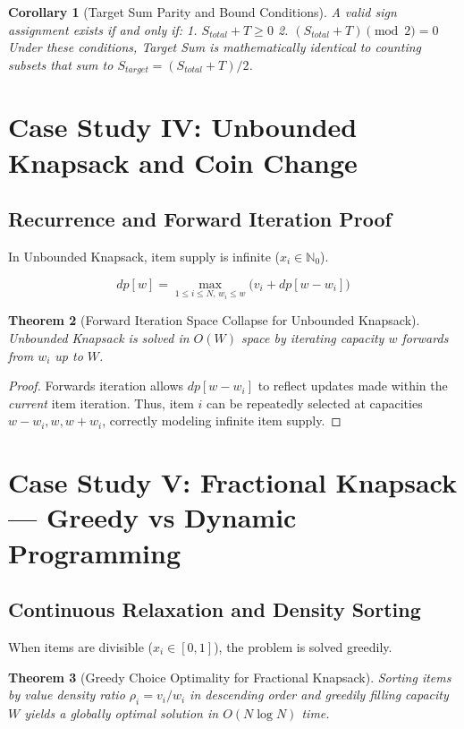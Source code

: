 \documentclass[10pt,journal,compsoc,onecolumn]{IEEEtran}
\newtheorem{theorem}{Theorem}
\newtheorem{corollary}[theorem]{Corollary}
\begin{document}
\begin{corollary}[Target Sum Parity and Bound Conditions]
A valid sign assignment exists if and only if:
1. $S_{total} + T \ge 0$
2. $(S_{total} + T) \pmod 2 = 0$
Under these conditions, Target Sum is mathematically identical to counting subsets that sum to $S_{target} = (S_{total} + T) / 2$.
\end{corollary}


\section{Case Study IV: Unbounded Knapsack and Coin Change}
\label{sec:unbounded-knapsack}

\subsection{Recurrence and Forward Iteration Proof}

In Unbounded Knapsack, item supply is infinite ($x_i \in \mathbb{N}_0$).

\[
dp[w] = \max_{1 \le i \le N, \, w_i \le w} \Big(v_i + dp[w - w_i]\Big)
\]

\begin{theorem}[Forward Iteration Space Collapse for Unbounded Knapsack]
Unbounded Knapsack is solved in $O(W)$ space by iterating capacity $w$ \emph{forwards} from $w_i$ up to $W$.
\end{theorem}

\begin{proof}
Forwards iteration allows $dp[w - w_i]$ to reflect updates made within the \emph{current} item iteration. Thus, item $i$ can be repeatedly selected at capacities $w - w_i, w, w + w_i$, correctly modeling infinite item supply.
\end{proof}


\section{Case Study V: Fractional Knapsack --- Greedy vs Dynamic Programming}
\label{sec:fractional-knapsack}

\subsection{Continuous Relaxation and Density Sorting}

When items are divisible ($x_i \in [0, 1]$), the problem is solved greedily.

\begin{theorem}[Greedy Choice Optimality for Fractional Knapsack]
Sorting items by value density ratio $\rho_i = v_i / w_i$ in descending order and greedily filling capacity $W$ yields a globally optimal solution in $O(N \log N)$ time.
\end{theorem}
\end{document}
